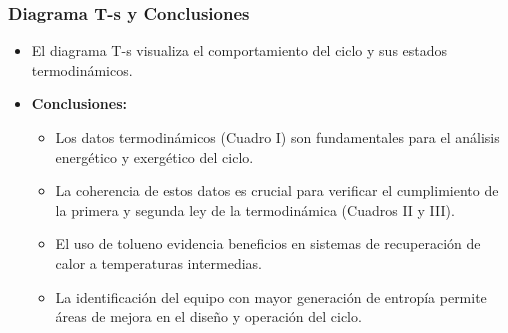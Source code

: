 \documentclass{beamer}
\begin{document}
\begin{frame}
    \frametitle{Diagrama T-s y Conclusiones}
    \begin{center}
    \end{center}
    \begin{itemize}
        \item El diagrama T-s visualiza el comportamiento del ciclo y sus estados termodinámicos.
        \item \textbf{Conclusiones:} 
        \begin{itemize}
            \item Los datos termodinámicos (Cuadro I) son fundamentales para el análisis energético y exergético del ciclo.
            \item La coherencia de estos datos es crucial para verificar el cumplimiento de la primera y segunda ley de la termodinámica (Cuadros II y III).
            \item El uso de tolueno evidencia beneficios en sistemas de recuperación de calor a temperaturas intermedias.
            \item La identificación del equipo con mayor generación de entropía permite áreas de mejora en el diseño y operación del ciclo.
        \end{itemize}
    \end{itemize}
\end{frame}
\end{document}
